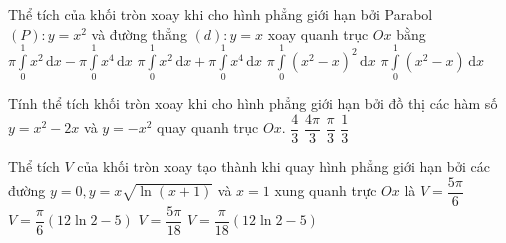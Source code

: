 \begin{ex}%
	Thể tích của khối tròn xoay khi cho hình phẳng giới hạn bởi Parabol $(P)\colon y=x^2$ và đường thẳng $(d)\colon y=x$ xoay quanh trục $Ox$ bằng 
	\choice
	{\True $\pi\displaystyle\int\limits_0^1 x^2\mathrm{\,d}x-\pi\displaystyle\int\limits_0^1 x^4\mathrm{\,d}x$}
	{$\pi\displaystyle\int\limits_0^1 x^2\mathrm{\,d}x+\pi\displaystyle\int\limits_0^1 x^4\mathrm{\,d}x$}
	{$\pi\displaystyle\int\limits_0^1\left(x^2-x\right)^2\mathrm{\,d}x$}
	{$\pi\displaystyle\int\limits_0^1\left(x^2-x\right)\mathrm{\,d}x$}
\end{ex}
\begin{ex}%
	Tính thể tích khối tròn xoay khi cho hình phẳng giới hạn bởi đồ thị các hàm số $y=x^2-2x$ và $y=-x^2$ quay quanh trục $Ox$. 
	\choice
	{$\dfrac{4}{3}$}
	{$\dfrac{4\pi}{3}$}
	{\True $\dfrac{\pi}{3}$}
	{$\dfrac{1}{3}$}
\end{ex}
\begin{ex}%
	Thể tích $V$ của khối tròn xoay tạo thành khi quay hình phẳng giới hạn bởi các đường $y=0,y=x\sqrt{\ln (x+1)}$ và $x=1$ xung quanh trực $Ox$ là 
	\choice
	{$V=\dfrac{5\pi}{6}$}
	{$V=\dfrac{\pi}{6}(12\ln 2-5)$}
	{$V=\dfrac{5\pi}{18}$}
	{\True $V=\dfrac{\pi}{18}(12\ln 2-5)$}
\end{ex}

